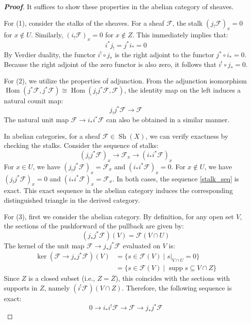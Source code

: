 \begin{proof}[\textbf{Proof}]
It suffices to show these properties in the abelian category of sheaves. 

For (1), consider the stalks of the sheaves. For a sheaf $\mathcal{F}$, the stalk $(j_! \mathcal{F})_x = 0$ for $x \notin U$. Similarly, $(i_! \mathcal{F})_x = 0$ for $x \notin Z$. This immediately implies that:
\begin{equation*}
    i^* j_! = j^* i_* = 0
\end{equation*}
By Verdier duality, the functor $i^! \circ j_*$ is the right adjoint to the functor $j^* \circ i_* = 0$. Because the right adjoint of the zero functor is also zero, it follows that $i^! \circ j_* = 0$.

For (2), we utilize the properties of adjunction. From the adjunction isomorphism $\operatorname{Hom}(j^* \mathcal{F}, j^* \mathcal{F}) \cong \operatorname{Hom}(j_! j^* \mathcal{F}, \mathcal{F})$, the identity map on the left induces a natural counit map:
\begin{equation*}
    j_! j^* \mathcal{F} \longrightarrow \mathcal{F}
\end{equation*}
The natural unit map $\mathcal{F} \longrightarrow i_* i^* \mathcal{F}$ can also be obtained in a similar manner. 

In abelian categories, for a sheaf $\mathcal{F} \in \operatorname{Sh}(X)$, we can verify exactness by checking the stalks. Consider the sequence of stalks:
\begin{equation} \label{stalk_seq}
    (j_! j^* \mathcal{F})_x \longrightarrow \mathcal{F}_x \longrightarrow (i_* i^* \mathcal{F})_x \tag{*}
\end{equation}
For $x \in U$, we have $(j_! j^* \mathcal{F})_x = \mathcal{F}_x$ and $(i_* i^* \mathcal{F})_x = 0$. 
For $x \notin U$, we have $(j_! j^* \mathcal{F})_x = 0$ and $(i_* i^* \mathcal{F})_x = \mathcal{F}_x$. 
In both cases, the sequence \eqref{stalk_seq} is exact. This exact sequence in the abelian category induces the corresponding distinguished triangle in the derived category.

For (3), first we consider the abelian category. By definition, for any open set $V$, the sections of the pushforward of the pullback are given by:
\begin{equation*}
    (j_* j^* \mathcal{F})(V) = \mathcal{F}(V \cap U)
\end{equation*}
The kernel of the unit map $\mathcal{F} \longrightarrow j_* j^* \mathcal{F}$ evaluated on $V$ is:
\begin{align*}
    \ker(\mathcal{F} \longrightarrow j_* j^* \mathcal{F})(V) &= \{ s \in \mathcal{F}(V) \mid s|_{V \cap U} = 0 \} \\
    &= \{ s \in \mathcal{F}(V) \mid \operatorname{supp} s \subseteq V \cap Z \}
\end{align*}
Since $Z$ is a closed subset (i.e., $Z = \overline{Z}$), this coincides with the sections with supports in $Z$, namely $(i^! \mathcal{F})(V \cap Z)$. 
Therefore, the following sequence is exact:
\begin{equation*}
    0 \longrightarrow i_* i^! \mathcal{F} \longrightarrow \mathcal{F} \longrightarrow j_* j^* \mathcal{F}
\end{equation*}


\end{proof}
